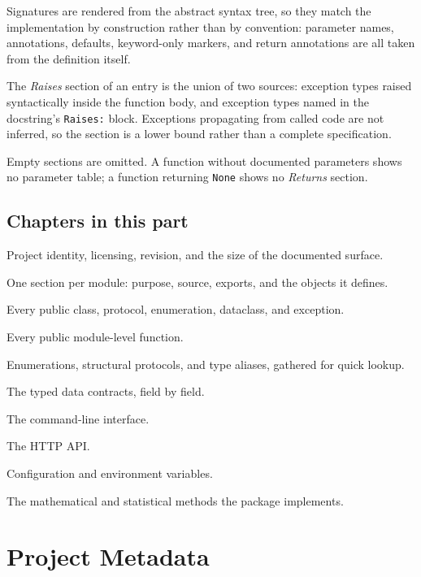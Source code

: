 Signatures are rendered from the abstract syntax tree, so they match the
implementation by construction rather than by convention: parameter names,
annotations, defaults, keyword-only markers, and return annotations are all
taken from the definition itself.

The \emph{Raises} section of an entry is the union of two sources: exception
types raised syntactically inside the function body, and exception types named
in the docstring's \texttt{Raises:} block. Exceptions propagating from called
code are not inferred, so the section is a lower bound rather than a complete
specification.

Empty sections are omitted. A function without documented parameters shows no
parameter table; a function returning \texttt{None} shows no \emph{Returns}
section.

\section{Chapters in this part}

\begin{description}[nosep]
  \item[\cref{ch:project-metadata}] Project identity, licensing, revision, and
    the size of the documented surface.
  \item[\cref{ch:modules}] One section per module: purpose, source, exports,
    and the objects it defines.
  \item[\cref{ch:classes}] Every public class, protocol, enumeration,
    dataclass, and exception.
  \item[\cref{ch:functions}] Every public module-level function.
  \item[\cref{ch:types}] Enumerations, structural protocols, and type aliases,
    gathered for quick lookup.
  \item[\cref{ch:schemas}] The typed data contracts, field by field.
  \item[\cref{ch:cli}] The command-line interface.
  \item[\cref{ch:http}] The HTTP API.
  \item[\cref{ch:configuration}] Configuration and environment variables.
  \item[\cref{ch:mathematics}] The mathematical and statistical methods the
    package implements.
\end{description}

\chapter{Project Metadata}
\label{ch:project-metadata}

